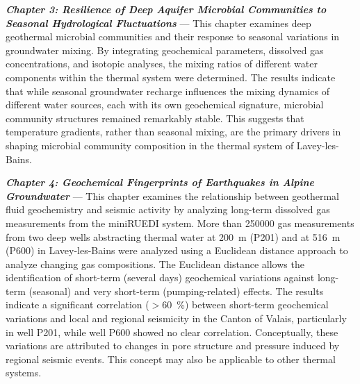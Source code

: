 \textbf{\textit{Chapter 3: Resilience of Deep Aquifer Microbial Communities to Seasonal Hydrological Fluctuations}} --- This chapter examines deep geothermal microbial communities and their response to seasonal variations in groundwater mixing.
By integrating geochemical parameters, dissolved gas concentrations, and isotopic analyses, the mixing ratios of different water components within the thermal system were determined.
The results indicate that while seasonal groundwater recharge influences the mixing dynamics of different water sources, each with its own geochemical signature, microbial community structures remained remarkably stable.
This suggests that temperature gradients, rather than seasonal mixing, are the primary drivers in shaping microbial community composition in the thermal system of Lavey-les-Bains.\vspace{10pt}

\textbf{\textit{Chapter 4: Geochemical Fingerprints of Earthquakes in Alpine Groundwater}} --- This chapter examines the relationship between geothermal fluid geochemistry and seismic activity by analyzing long-term dissolved gas measurements from the miniRUEDI system.
More than \num{250000} gas measurements from two deep wells abstracting thermal water at \SI{200}{\metre} (P201) and at \SI{516}{\metre} (P600) in Lavey-les-Bains were analyzed using a Euclidean distance approach to analyze changing gas compositions.
The Euclidean distance allows the identification of short-term (several days) geochemical variations against long-term (seasonal) and very short-term (pumping-related) effects.
The results indicate a significant correlation ($>$\SI{60}{\percent}) between short-term geochemical variations and local and regional seismicity in the Canton of Valais, particularly in well P201, while well P600 showed no clear correlation.
Conceptually, these variations are attributed to changes in pore structure and pressure induced by regional seismic events.
This concept may also be applicable to other thermal systems.